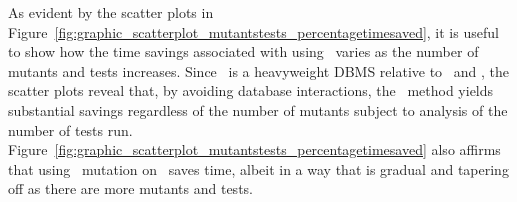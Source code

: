 
 As evident by the scatter plots in Figure~\ref{fig:graphic_scatterplot_mutantstests_percentagetimesaved}, it is useful to show how the time savings associated with using \virtualmutationanalysis~varies as the number of mutants and tests increases. Since \postgres~is a heavyweight DBMS relative to \HyperSQL~and \sqlite, the scatter plots reveal that, by avoiding database interactions, the \virtual~method yields substantial savings regardless of the number of mutants subject to analysis of the number of tests run.  Figure~\ref{fig:graphic_scatterplot_mutantstests_percentagetimesaved} also affirms that using \virtual~mutation on \HyperSQL~saves time, albeit in a way that is gradual and tapering off as there are more mutants and tests.







